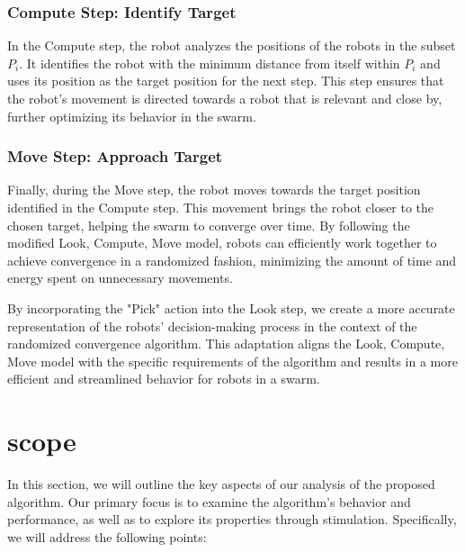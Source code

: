 \documentclass[]{report}
\begin{document}
\subsubsection{Compute Step: Identify Target}

In the Compute step, the robot analyzes the positions of the robots in the subset \(P_i\). It identifies the robot with the minimum distance from itself within \(P_i\) and uses its position as the target position for the next step. This step ensures that the robot's movement is directed towards a robot that is relevant and close by, further optimizing its behavior in the swarm.

\subsubsection{Move Step: Approach Target}

Finally, during the Move step, the robot moves towards the target position identified in the Compute step. This movement brings the robot closer to the chosen target, helping the swarm to converge over time. By following the modified Look, Compute, Move model, robots can efficiently work together to achieve convergence in a randomized fashion, minimizing the amount of time and energy spent on unnecessary movements.

By incorporating the "Pick" action into the Look step, we create a more accurate representation of the robots' decision-making process in the context of the randomized convergence algorithm. This adaptation aligns the Look, Compute, Move model with the specific requirements of the algorithm and results in a more efficient and streamlined behavior for robots in a swarm.

\section{scope}
In this section, we will outline the key aspects of our analysis of the proposed algorithm. Our primary focus is to examine the algorithm's behavior and performance, as well as to explore its properties through stimulation. Specifically, we will address the following points:
\end{document}
